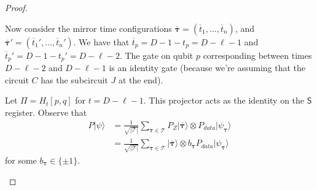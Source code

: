 \documentclass[11pt,letterpaper]{article}
\theoremstyle{definition}
\theoremstyle{remark}
\newcommand{\cT}{\mathcal T}
\numberwithin{equation}{section}
\theoremstyle{definition}
\newcommand{\comp}[1]{\overline{#1}}
\newcommand{\ket}[1]{|#1\rangle}
\newcommand{\sS}{{\mathsf{S}}}
\newcommand{\timeconfig}{{\bm{\tau}}}
\begin{document}
\begin{proof}
\begin{description}
\begin{description}
  Now consider the mirror time configurations $\comp{\timeconfig} = (\comp{t}_1,\ldots,\comp{t}_n)$, and $\comp{\timeconfig}' = (\comp{t}_1',\ldots,\comp{t}_n')$. We have that $\comp{t}_p = D - 1 - t_p = D - \ell - 1$ and $\comp{t}_p' = D - 1 - t_p' = D - \ell - 2$. The gate on qubit $p$ corresponding between times $D - \ell - 2$ and $D - \ell - 1$ is an identity gate (because we're assuming that the circuit $C$ has the subcircuit $J$ at the end). %
  
  Let $\Pi = H_t[p,q]$ for $t = D - \ell - 1$. This projector acts as the identity on the $\sS$ register. Observe that
  \begin{align}
    P \ket{\psi} &= \frac{1}{\sqrt{|\cT|}} \sum_{\timeconfig \in \cT} P_Z \ket{\comp{\timeconfig}} \otimes P_{data} \ket{\psi_{\timeconfig}} \\
    &= \frac{1}{\sqrt{|\cT|}} \sum_{\timeconfig \in \cT} \ket{\comp{\timeconfig}} \otimes b_\timeconfig P_{data} \ket{\psi_{\timeconfig}}
  \end{align}
  for some $b_\timeconfig \in \{\pm 1\}$. 
  

\end{description}
\end{description}
\end{proof}
\end{document}
